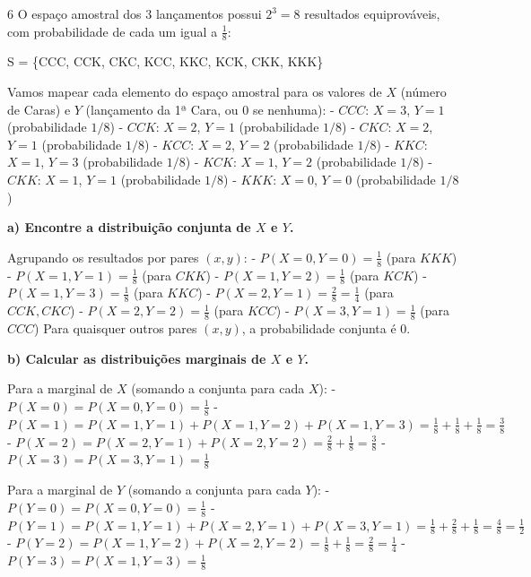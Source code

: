 \documentclass[8pt, a4paper, landscape]{extarticle}
\begin{document}
\begin{multicols}{6}
\vspace{0.3cm}
O espaço amostral dos 3 lançamentos possui $2^3 = 8$ resultados equiprováveis, com probabilidade de cada um igual a $\frac{1}{8}$:
\begin{eqfit}
S = \{CCC, CCK, CKC, KCC, KKC, KCK, CKK, KKK\}
\end{eqfit}

Vamos mapear cada elemento do espaço amostral para os valores de $X$ (número de Caras) e $Y$ (lançamento da 1ª Cara, ou 0 se nenhuma):
- $CCC$: $X = 3$, $Y = 1$ (probabilidade $1/8$)
- $CCK$: $X = 2$, $Y = 1$ (probabilidade $1/8$)
- $CKC$: $X = 2$, $Y = 1$ (probabilidade $1/8$)
- $KCC$: $X = 2$, $Y = 2$ (probabilidade $1/8$)
- $KKC$: $X = 1$, $Y = 3$ (probabilidade $1/8$)
- $KCK$: $X = 1$, $Y = 2$ (probabilidade $1/8$)
- $CKK$: $X = 1$, $Y = 1$ (probabilidade $1/8$)
- $KKK$: $X = 0$, $Y = 0$ (probabilidade $1/8$)

\vspace{0.3cm}
\textbf{a) Encontre a distribuição conjunta de $X$ e $Y$.}
\vspace{0.2cm}

Agrupando os resultados por pares $(x,y)$:
- $P(X=0, Y=0) = \frac{1}{8}$ (para $KKK$)
- $P(X=1, Y=1) = \frac{1}{8}$ (para $CKK$)
- $P(X=1, Y=2) = \frac{1}{8}$ (para $KCK$)
- $P(X=1, Y=3) = \frac{1}{8}$ (para $KKC$)
- $P(X=2, Y=1) = \frac{2}{8} = \frac{1}{4}$ (para $CCK, CKC$)
- $P(X=2, Y=2) = \frac{1}{8}$ (para $KCC$)
- $P(X=3, Y=1) = \frac{1}{8}$ (para $CCC$)
Para quaisquer outros pares $(x,y)$, a probabilidade conjunta é $0$.

\vspace{0.3cm}
\textbf{b) Calcular as distribuições marginais de $X$ e $Y$.}
\vspace{0.2cm}

Para a marginal de $X$ (somando a conjunta para cada $X$):
- $P(X=0) = P(X=0, Y=0) = \frac{1}{8}$
- $P(X=1) = P(X=1, Y=1) + P(X=1, Y=2) + P(X=1, Y=3) = \frac{1}{8} + \frac{1}{8} + \frac{1}{8} = \frac{3}{8}$
- $P(X=2) = P(X=2, Y=1) + P(X=2, Y=2) = \frac{2}{8} + \frac{1}{8} = \frac{3}{8}$
- $P(X=3) = P(X=3, Y=1) = \frac{1}{8}$

Para a marginal de $Y$ (somando a conjunta para cada $Y$):
- $P(Y=0) = P(X=0, Y=0) = \frac{1}{8}$
- $P(Y=1) = P(X=1, Y=1) + P(X=2, Y=1) + P(X=3, Y=1) = \frac{1}{8} + \frac{2}{8} + \frac{1}{8} = \frac{4}{8} = \frac{1}{2}$
- $P(Y=2) = P(X=1, Y=2) + P(X=2, Y=2) = \frac{1}{8} + \frac{1}{8} = \frac{2}{8} = \frac{1}{4}$
- $P(Y=3) = P(X=1, Y=3) = \frac{1}{8}$


\end{multicols}
\end{document}
